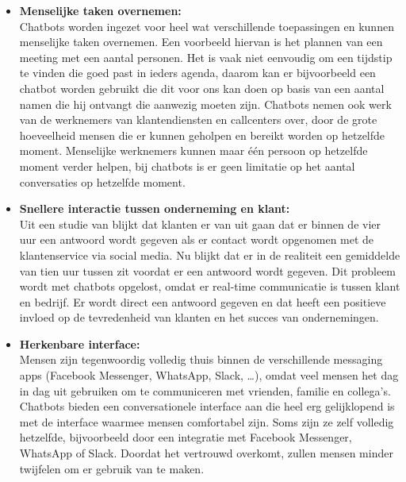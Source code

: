 \begin{itemize}
    \item \textbf{Menselijke taken overnemen:} \\
    
    Chatbots worden ingezet voor heel wat verschillende toepassingen en kunnen menselijke taken overnemen. Een voorbeeld hiervan is het plannen van een meeting met een aantal personen. Het is vaak niet eenvoudig om een tijdstip te vinden die goed past in ieders agenda, daarom kan er bijvoorbeeld een chatbot worden gebruikt die dit voor ons kan doen op basis van een aantal namen die hij ontvangt die aanwezig moeten zijn. Chatbots nemen ook werk van de werknemers van klantendiensten en callcenters over, door de grote hoeveelheid mensen die er kunnen geholpen en bereikt worden op hetzelfde moment. Menselijke werknemers kunnen maar één persoon op hetzelfde moment verder helpen, bij chatbots is er geen limitatie op het aantal conversaties op hetzelfde moment. \\
    
    \item \textbf{Snellere interactie tussen onderneming en klant:} \\
    
    Uit een studie van \textcite{Social2016} blijkt dat klanten er van uit gaan dat er binnen de vier uur een antwoord wordt gegeven als er contact wordt opgenomen met de klantenservice via social media. Nu blijkt dat er in de realiteit een gemiddelde van tien uur tussen zit voordat er een antwoord wordt gegeven. Dit probleem wordt met chatbots opgelost, omdat er real-time communicatie is tussen klant en bedrijf. Er wordt direct een antwoord gegeven en dat heeft een positieve invloed op de tevredenheid van klanten en het succes van ondernemingen. \\
    
    \item \textbf{Herkenbare interface:} \\
    
    Mensen zijn tegenwoordig volledig thuis binnen de verschillende messaging apps (Facebook Messenger, WhatsApp, Slack, …), omdat veel mensen het dag in dag uit gebruiken om te communiceren met vrienden, familie en collega’s. Chatbots bieden een conversationele interface aan die heel erg gelijklopend is met de interface waarmee mensen comfortabel zijn. Soms zijn ze zelf volledig hetzelfde, bijvoorbeeld door een integratie met Facebook Messenger, WhatsApp of Slack. Doordat het vertrouwd overkomt, zullen mensen minder twijfelen om er gebruik van te maken. \\
    

\end{itemize}
